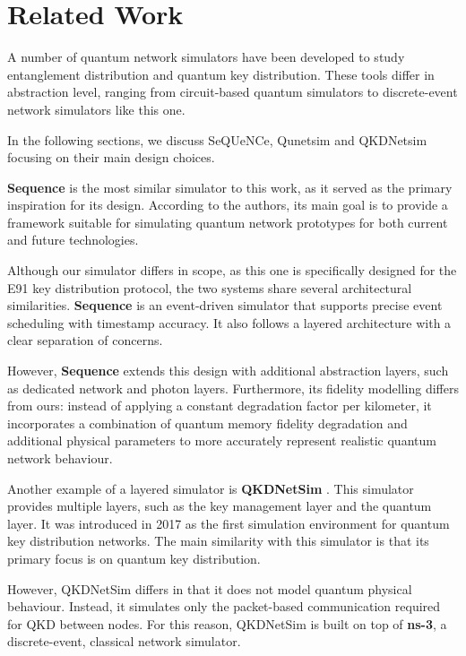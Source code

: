 \section{Related Work}\label{s:related}

A number of quantum network simulators have been developed to study entanglement distribution and quantum key distribution. These tools differ in abstraction level, ranging from circuit-based quantum simulators to discrete-event network simulators like this one. 

In the following sections, we discuss SeQUeNCe, Qunetsim and QKDNetsim focusing on their main design choices.

\textbf{Sequence} \cite{wu2021sequence} is the most similar simulator to this work, as it served as the primary inspiration for its design. According to the authors, its main goal is to provide a framework suitable for simulating quantum network prototypes for both current and future technologies.

Although our simulator differs in scope, as this one is specifically designed for the E91 key distribution protocol, the two systems share several architectural similarities. \textbf{Sequence} is an event-driven simulator that supports precise event scheduling with timestamp accuracy. It also follows a layered architecture with a clear separation of concerns.

However, \textbf{Sequence} extends this design with additional abstraction layers, such as dedicated network and photon layers. Furthermore, its fidelity modelling differs from ours: instead of applying a constant degradation factor per kilometer, it incorporates a combination of quantum memory fidelity degradation and additional physical parameters to more accurately represent realistic quantum network behaviour.

Another example of a layered simulator is \textbf{QKDNetSim} \cite{mehic2022qkdnetsim}. This simulator provides multiple layers, such as the key management layer and the quantum layer. It was introduced in 2017 as the first simulation environment for quantum key distribution networks. The main similarity with this simulator is that its primary focus is on quantum key distribution.

However, QKDNetSim differs in that it does not model quantum physical behaviour. Instead, it simulates only the packet-based communication required for QKD between nodes. For this reason, QKDNetSim is built on top of \textbf{ns-3}, a discrete-event, classical network simulator.

